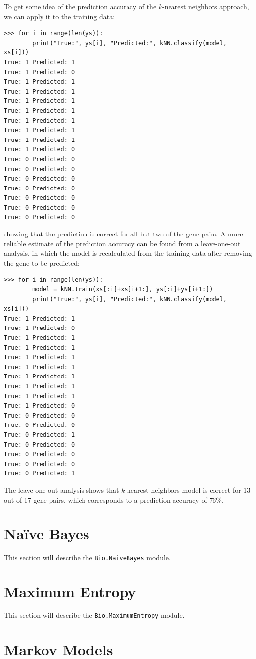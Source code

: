 \documentclass{report}
\begin{document}
To get some idea of the prediction accuracy of the $k$-nearest neighbors approach, we can apply it to the training data:
\begin{verbatim}
>>> for i in range(len(ys)):
        print("True:", ys[i], "Predicted:", kNN.classify(model, xs[i]))
True: 1 Predicted: 1
True: 1 Predicted: 0
True: 1 Predicted: 1
True: 1 Predicted: 1
True: 1 Predicted: 1
True: 1 Predicted: 1
True: 1 Predicted: 1
True: 1 Predicted: 1
True: 1 Predicted: 1
True: 1 Predicted: 0
True: 0 Predicted: 0
True: 0 Predicted: 0
True: 0 Predicted: 0
True: 0 Predicted: 0
True: 0 Predicted: 0
True: 0 Predicted: 0
True: 0 Predicted: 0
\end{verbatim}
showing that the prediction is correct for all but two of the gene pairs. A more reliable estimate of the prediction accuracy can be found from a leave-one-out analysis, in which the model is recalculated from the training data after removing the gene to be predicted:
\begin{verbatim}
>>> for i in range(len(ys)):
        model = kNN.train(xs[:i]+xs[i+1:], ys[:i]+ys[i+1:])
        print("True:", ys[i], "Predicted:", kNN.classify(model, xs[i]))
True: 1 Predicted: 1
True: 1 Predicted: 0
True: 1 Predicted: 1
True: 1 Predicted: 1
True: 1 Predicted: 1
True: 1 Predicted: 1
True: 1 Predicted: 1
True: 1 Predicted: 1
True: 1 Predicted: 1
True: 1 Predicted: 0
True: 0 Predicted: 0
True: 0 Predicted: 0
True: 0 Predicted: 1
True: 0 Predicted: 0
True: 0 Predicted: 0
True: 0 Predicted: 0
True: 0 Predicted: 1
\end{verbatim}
The leave-one-out analysis shows that $k$-nearest neighbors model is correct for 13 out of 17 gene pairs, which corresponds to a prediction accuracy of 76\%.

\section{Na\"ive Bayes}

This section will describe the \verb|Bio.NaiveBayes| module.

\section{Maximum Entropy}

This section will describe the \verb|Bio.MaximumEntropy| module.

\section{Markov Models}
\end{document}
